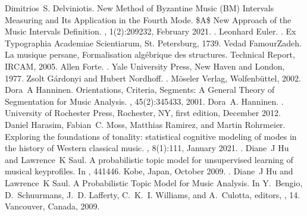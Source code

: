 \documentclass[letterpaper,10pt,english]{sphinxmanual}
\begin{document}
\begin{sphinxthebibliography}{10}
\sphinxAtStartPar
Dimitrios S. Delviniotis. New Method of Byzantine Music (BM) Intervals\textquotesingle{} Measuring and Its Application in the Fourth Mode. \$A\$ New Approach of the Music Intervals\textquotesingle{} Definition. , 1(2):209\textendash{}232, February 2021. .
\sphinxAtStartPar
Leonhard Euler. . Ex Typographia Academiae Scientiarum, St. Petersburg, 1739.
\sphinxAtStartPar
Vedad FamourZadeh. La musique persane, Formalisation algébrique des structures. Technical Report, IRCAM, 2005.
\sphinxAtStartPar
Allen Forte. . Yale University Press, New Haven and London, 1977.
\sphinxAtStartPar
Zsolt Gárdonyi and Hubert Nordhoff. . Möseler Verlag, Wolfenbüttel, 2002.
\sphinxAtStartPar
Dora A Hanninen. Orientations, Criteria, Segments: A General Theory of Segmentation for Music Analysis. , 45(2):345\textendash{}433, 2001.
\sphinxAtStartPar
Dora A. Hanninen. . University of Rochester Press, Rochester, NY, first edition, December 2012.
\sphinxAtStartPar
Daniel Harasim, Fabian C. Moss, Matthias Ramirez, and Martin Rohrmeier. Exploring the foundations of tonality: statistical cognitive modeling of modes in the history of Western classical music. , 8(1):1\textendash{}11, January 2021. .
\sphinxAtStartPar
Diane J Hu and Lawrence K Saul. A probabilistic topic model for unsupervised learning of musical key\sphinxhyphen{}profiles. In , 441\textendash{}446. Kobe, Japan, October 2009. .
\sphinxAtStartPar
Diane J Hu and Lawrence K Saul. A Probabilistic Topic Model for Music Analysis. In Y. Bengio, D. Schuurmans, J. D. Lafferty, C. K. I. Williams, and A. Culotta, editors, , 1\textendash{}4. Vancouver, Canada, 2009.

\end{sphinxthebibliography}
\end{document}
